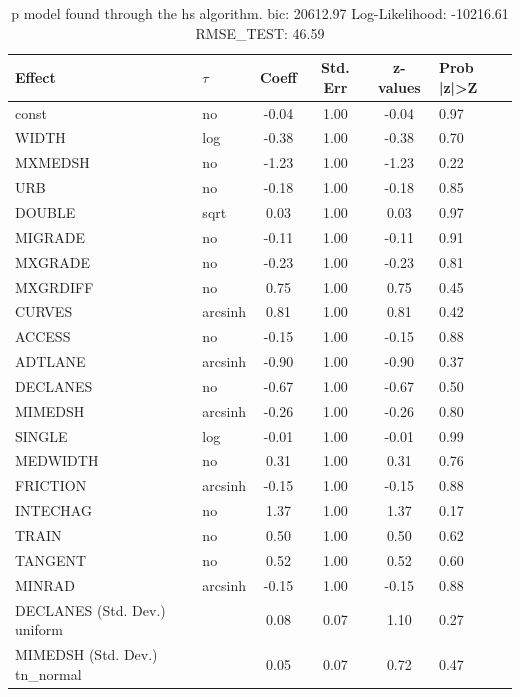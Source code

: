 \begin{table}
	\caption{p model found through the hs algorithm. bic: 20612.97 Log-Likelihood: -10216.61 RMSE_TEST: 46.59}
	\begin{center}
		\begin{tabular}{|l|l|c|c|c|l|}
			\hline
			Effect & $\tau$ & Coeff & Std. Err & z-values & Prob |z|>Z \\
			\hline
			const & no & -0.04 & 1.00 & -0.04 & 0.97 \\
			\hline
			WIDTH & log & -0.38 & 1.00 & -0.38 & 0.70 \\
			\hline
			MXMEDSH & no & -1.23 & 1.00 & -1.23 & 0.22 \\
			\hline
			URB & no & -0.18 & 1.00 & -0.18 & 0.85 \\
			\hline
			DOUBLE & sqrt & 0.03 & 1.00 & 0.03 & 0.97 \\
			\hline
			MIGRADE & no & -0.11 & 1.00 & -0.11 & 0.91 \\
			\hline
			MXGRADE & no & -0.23 & 1.00 & -0.23 & 0.81 \\
			\hline
			MXGRDIFF & no & 0.75 & 1.00 & 0.75 & 0.45 \\
			\hline
			CURVES & arcsinh & 0.81 & 1.00 & 0.81 & 0.42 \\
			\hline
			ACCESS & no & -0.15 & 1.00 & -0.15 & 0.88 \\
			\hline
			ADTLANE & arcsinh & -0.90 & 1.00 & -0.90 & 0.37 \\
			\hline
			DECLANES & no & -0.67 & 1.00 & -0.67 & 0.50 \\
			\hline
			MIMEDSH & arcsinh & -0.26 & 1.00 & -0.26 & 0.80 \\
			\hline
			SINGLE & log & -0.01 & 1.00 & -0.01 & 0.99 \\
			\hline
			MEDWIDTH & no & 0.31 & 1.00 & 0.31 & 0.76 \\
			\hline
			FRICTION & arcsinh & -0.15 & 1.00 & -0.15 & 0.88 \\
			\hline
			INTECHAG & no & 1.37 & 1.00 & 1.37 & 0.17 \\
			\hline
			TRAIN & no & 0.50 & 1.00 & 0.50 & 0.62 \\
			\hline
			TANGENT & no & 0.52 & 1.00 & 0.52 & 0.60 \\
			\hline
			MINRAD & arcsinh & -0.15 & 1.00 & -0.15 & 0.88 \\
			\hline
			DECLANES (Std. Dev.) uniform &  & 0.08 & 0.07 & 1.10 & 0.27 \\
			\hline
			MIMEDSH (Std. Dev.) tn_normal &  & 0.05 & 0.07 & 0.72 & 0.47 \\

\end{tabular}
\end{center}
\end{table}

